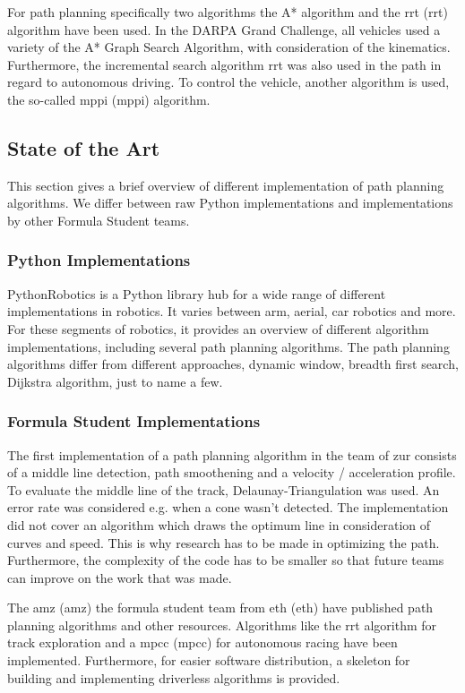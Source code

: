 For path planning specifically two algorithms the A* algorithm and the \acrlong{rrt} (\acrshort{rrt}) algorithm have been used. In the DARPA Grand Challenge, all vehicles used a variety of the A* Graph Search Algorithm, with consideration of the kinematics. Furthermore, the incremental search algorithm \acrshort{rrt} was also used in the path in regard to autonomous driving.
To control the vehicle, another algorithm is used, the so-called \acrlong{mppi} (\acrshort{mppi}) algorithm.
\cite{path_planning_and_control_georgiev}

\subsection{State of the Art}
This section gives a brief overview of different implementation of path planning algorithms. We differ between raw Python implementations and implementations by other Formula Student teams.

\subsubsection{Python Implementations}
PythonRobotics is a Python library hub for a wide range of different implementations in robotics. It varies between arm, aerial, car robotics and more.
For these segments of robotics, it provides an overview of different algorithm implementations, including several path planning algorithms.
The path planning algorithms differ from different approaches, dynamic window, breadth first search, Dijkstra algorithm, just to name a few. 
\cite{python_robotics}

\subsubsection{Formula Student Implementations}
The first implementation of a path planning algorithm in the team of \acrlong{zur} consists of a middle line detection, path smoothening and a velocity / acceleration profile. To evaluate the middle line of the track, Delaunay-Triangulation was used. An error rate was considered e.g. when a cone wasn't detected. The implementation did not cover an algorithm which draws the optimum line in consideration of curves and speed. This is why research has to be made in optimizing the path. Furthermore, the complexity of the code has to be smaller so that future teams can improve on the work that was made.
\cite{autopilot_for_formula_student_jerome}

The \acrshort{amz} (\acrlong{amz}) the formula student team from \acrshort{eth} (\acrlong{eth}) have published path planning algorithms and other resources. Algorithms like the \acrshort{rrt} algorithm for track exploration and a \acrlong{mpcc} (\acrshort{mpcc}) for autonomous racing have been implemented. Furthermore, for easier software distribution, a skeleton for building and implementing driverless algorithms is provided.
\cite{amz_racing_github}

